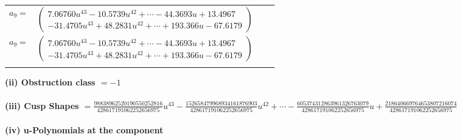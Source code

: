 \documentclass[1p]{elsarticle_modified}
\theoremstyle{definition}
\begin{document}
\begin{tabular}{m{7pt} m{180pt} m{7pt} m{180pt} }
\flushright $a_{9}=$&$\begin{pmatrix}7.06760 u^{43}-10.5739 u^{42}+\cdots-44.3693 u+13.4967\\-31.4705 u^{43}+48.2831 u^{42}+\cdots+193.366 u-67.6179\end{pmatrix}$\\ \flushright $a_{9}=$&$\begin{pmatrix}7.06760 u^{43}-10.5739 u^{42}+\cdots-44.3693 u+13.4967\\-31.4705 u^{43}+48.2831 u^{42}+\cdots+193.366 u-67.6179\end{pmatrix}$\\&\end{tabular}
\flushleft \textbf{(ii) Obstruction class $= -1$}\\~\\
\flushleft \textbf{(iii) Cusp Shapes $= \frac{98838962520190550252816}{428617191062252656975} u^{43}-\frac{152658479968934161876903}{428617191062252656975} u^{42}+\cdots-\frac{605374312863961326763079}{428617191062252656975} u+\frac{218640669764653807216074}{428617191062252656975}$}\\~\\
\newpage\renewcommand{\arraystretch}{1}
\flushleft \textbf{(iv) u-Polynomials at the component}\newline \\
\end{document}
